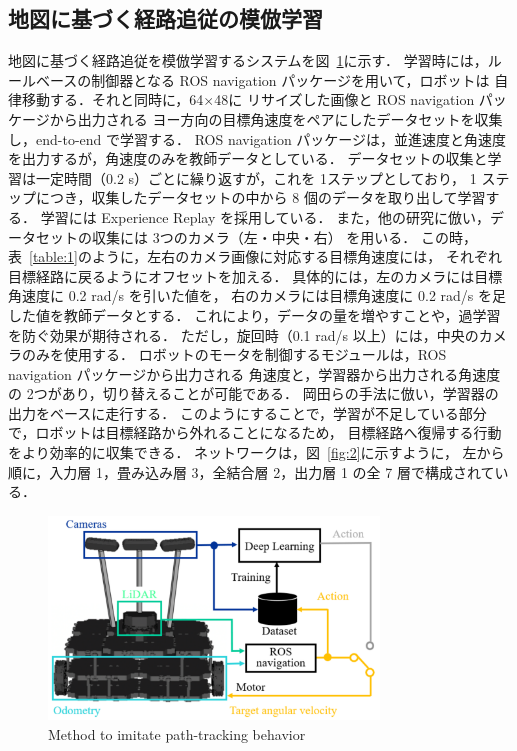 \documentclass{jarticle}
\renewcommand{\figurename}{図~}
\renewcommand{\tablename}{表~}
\newcommand{\figref}[1]{\figurename\ref{#1}}
\newcommand{\tabref}[1]{\tablename\ref{#1}}
\begin{document}
\subsection{地図に基づく経路追従の模倣学習}
地図に基づく経路追従を模倣学習するシステムを\figref{fig:3}に示す．
学習時には，ルールベースの制御器となる ROS navigation パッケージ\cite{navigation}を用いて，ロボットは
自律移動する．それと同時に，64$×$48に リサイズした画像と ROS navigation パッケージから出力される
ヨー方向の目標角速度をペアにしたデータセットを収集し，end-to-end で学習する．
ROS navigation パッケージは，並進速度と角速度を出力するが，角速度のみを教師データとしている．
データセットの収集と学習は一定時間（0.2 s）ごとに繰り返すが，これを 1ステップとしており，
1 ステップにつき，収集したデータセットの中から 8 個のデータを取り出して学習する．
学習には Experience Replay を採用している．
また，他の研究\cite{Moridian}\cite{Bojarski}に倣い，データセットの収集には 3つのカメラ（左・中央・右）
を用いる．
この時，\tabref{table:1}のように，左右のカメラ画像に対応する目標角速度には，
それぞれ目標経路に戻るようにオフセットを加える．
具体的には，左のカメラには目標角速度に 0.2 rad/s を引いた値を，
右のカメラには目標角速度に 0.2 rad/s を足した値を教師データとする．
これにより，データの量を増やすことや，過学習を防ぐ効果が期待される．
ただし，旋回時（0.1 rad/s 以上）には，中央のカメラのみを使用する．
ロボットのモータを制御するモジュールは，ROS  navigation パッケージから出力される
角速度と，学習器から出力される角速度の 2つがあり，切り替えることが可能である．
岡田らの手法\cite{okada}に倣い，学習器の出力をベースに走行する．
このようにすることで，学習が不足している部分で，ロボットは目標経路から外れることになるため，
目標経路へ復帰する行動をより効率的に収集できる．
ネットワークは，\figref{fig:2}に示すように，
左から順に，入力層 1，畳み込み層 3，全結合層 2，出力層 1 の全 7 層で構成されている．

\begin{figure}[h!]
  \centering
   \includegraphics[height=54mm]{./pdf/learn.pdf}
   \caption{Method to imitate path-tracking behavior}
   \label{fig:3}
\end{figure}
\end{document}
